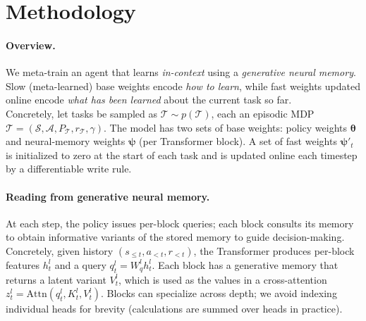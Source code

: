 \section{Methodology}
\paragraph{Overview.}
We meta-train an agent that learns \emph{in-context} using a \emph{generative neural memory}. Slow (meta-learned) base weights encode \emph{how to learn}, while fast weights updated online encode \emph{what has been learned} about the current task so far.
\\
Concretely, let tasks be sampled as \( \mathcal{T}\sim p(\mathcal{T}) \), each an episodic MDP
\( \mathcal{T}=(\mathcal{S},\mathcal{A},P_{\mathcal{T}},r_{\mathcal{T}},\gamma) \).
The model has two sets of base weights: policy weights \( \boldsymbol{\theta} \) and neural-memory weights \( \boldsymbol{\psi} \) (per Transformer block).
A set of fast weights \( \boldsymbol{\psi}'_t \) is initialized to zero at the start of each task and is updated online each timestep by a differentiable write rule.

\vspace{0.75ex}
\paragraph{Reading from generative neural memory.}
At each step, the policy issues per-block queries; each block consults its memory to obtain informative variants of the stored memory to guide decision-making.
\\
Concretely, given history \( (s_{\le t}, a_{<t}, r_{<t}) \), the Transformer produces per-block features \( h_t^l \) and a query \( q_t^l = W_q^l h_t^l \).
Each block has a generative memory that returns a latent variant \( V_t^l \), which is used as the values in a cross-attention
\( z_t^l = \mathrm{Attn}(q_t^l,K_t^l,V_t^l) \).
Blocks can specialize across depth; we avoid indexing individual heads for brevity (calculations are summed over heads in practice).

